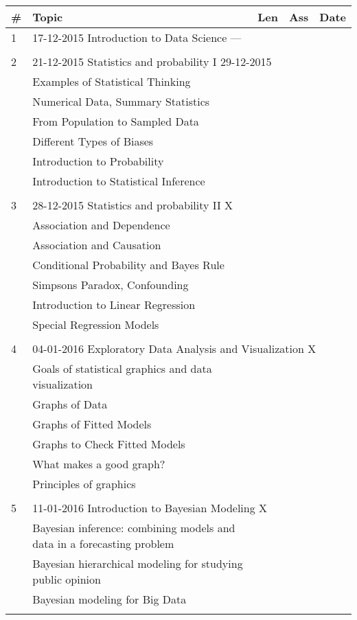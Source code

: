 \documentclass[a4paper,12pt]{article} %
\begin{document}
\begin{longtable}{|l|p{11cm}|l|l|l|}
	\hline
	\# & Topic & Len & Ass & Date \\
	\hline
	1 & \multicolumn{4}{|l|}{17-12-2015 \hfill Introduction to Data Science \hfill ---}\\
	\hline
	& & & &  \\
	\hline
	2 & \multicolumn{4}{|l|}{21-12-2015 \hfill Statistics and probability I \hfill 29-12-2015}\\
	\hline
	& Examples of Statistical Thinking & & &  \\
	\hline
	& Numerical Data, Summary Statistics & & &  \\
	\hline
	& From Population to Sampled Data & & &  \\
	\hline
	& Different Types of Biases & & &  \\
	\hline
	& Introduction to Probability & & &  \\
	\hline
	& Introduction to Statistical Inference & & &  \\
	\hline
	& & & &  \\
	\hline
	3 & \multicolumn{4}{|l|}{28-12-2015 \hfill Statistics and probability II \hfill X}\\
	\hline
	& Association and Dependence & & &  \\
	\hline
	& Association and Causation & & &  \\
	\hline
	& Conditional Probability and Bayes Rule & & &  \\
	\hline
	& Simpsons Paradox, Confounding & & &  \\
	\hline
	& Introduction to Linear Regression & & &  \\
	\hline
	& Special Regression Models & & &  \\
	\hline
	& & & &  \\
	\hline
	4 & \multicolumn{4}{|l|}{04-01-2016 \hfill Exploratory Data Analysis and Visualization \hfill X}\\
	\hline
	& Goals of statistical graphics and data visualization & & &  \\
	\hline
	& Graphs of Data & & &  \\
	\hline
	& Graphs of Fitted Models & & &  \\
	\hline
	& Graphs to Check Fitted Models & & &  \\
	\hline
	& What makes a good graph? & & &  \\
	\hline
	& Principles of graphics & & &  \\
	\hline
	& & & &  \\
	\hline
	5 & \multicolumn{4}{|l|}{11-01-2016 \hfill Introduction to Bayesian Modeling \hfill X}\\
	\hline
	& Bayesian inference: combining models and data in a forecasting problem & & &  \\
	\hline
	& Bayesian hierarchical modeling for studying public opinion & & &  \\
	\hline
	& Bayesian modeling for Big Data & & &  \\
	\hline
	& & & &  \\
	\hline
\end{longtable}
\end{document}
